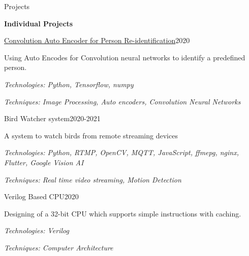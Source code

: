 \documentclass{resume} %
\begin{document}
\begin{rSection}{Projects}
\newpage


\textbf{Individual Projects}\\

\begin{rSubsection}{\href{https://github.com/HeshanDissanayake/Convolutional_Auto_encoder}{Convolution Auto Encoder for Person Re-identification}}{2020}{}{}
\item Using Auto Encodes for Convolution neural networks to identify a predefined person. \item 
\textit{Technologies: Python, Tensorflow, numpy}
\item \textit{Techniques: Image Processing, Auto encoders, Convolution Neural Networks}
\end{rSubsection}

\begin{rSubsection}{Bird Watcher system}{2020-2021}{}{}
\item A system to watch birds from remote streaming devices \item 
\textit{Technologies: Python, RTMP, OpenCV, MQTT, JavaScript, ffmepg, nginx, Flutter, Google Vision AI}
\item \textit{Techniques: Real time video streaming, Motion Detection}
\end{rSubsection}


\begin{rSubsection}{Verilog Based CPU}{2020}{}{}
\item Designing of a 32-bit CPU which supports simple instructions with caching. \item 
\textit{Technologies: Verilog}
\item \textit{Techniques: Computer Architecture }
\end{rSubsection}


\end{rSection}


\end{document}
